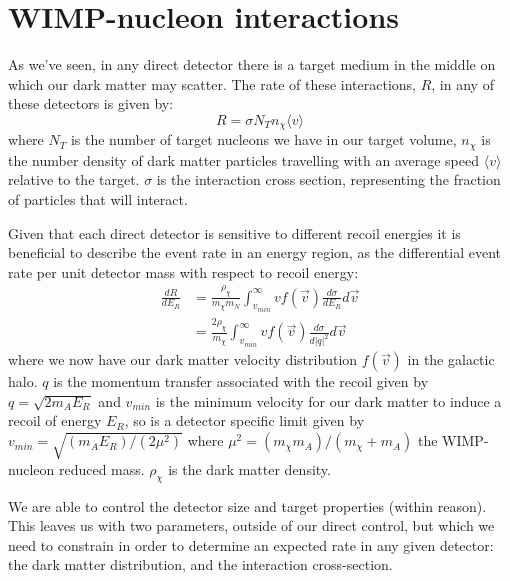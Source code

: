 \section{WIMP-nucleon interactions} \label{sec:wimp_nucleus_interactions}
\par
As we've seen, in any direct detector there is a target medium in the middle on which our dark matter may scatter.
The rate of these interactions, $R$, in any of these detectors is given by:
\begin{equation}
    R = \sigma N_{T} n_{\chi} \langle v \rangle
    \label{eq:wimp_nucleon_rate}
\end{equation}
where $N_T$ is the number of target nucleons we have in our target volume, $n_\chi$ is the number density of dark matter particles travelling with an average speed $\langle v \rangle$ relative to the target.
$\sigma$ is the interaction cross section, representing the fraction of particles that will interact.
\par
Given that each direct detector is sensitive to different recoil energies it is beneficial to describe the event rate in an energy region, as the differential event rate per unit detector mass with respect to recoil energy:
\begin{equation}
\begin{split}
    \frac{dR}{dE_R} &= \frac{\rho_{\chi}}{m_\chi m_N} \int^{\infty}_{v_{min}} v f(\vec{v}) \frac{d\sigma}{dE_R} d\vec{v} \\
                    &= \frac{2\rho_{\chi}}{m_\chi} \int^{\infty}_{v_{min}} v f(\vec{v}) \frac{d\sigma}{d |q|^2} d\vec{v}
\end{split}
\label{eq:wimp_differential_rate}
\end{equation}
where we now have our dark matter velocity distribution $f(\vec{v})$ in the galactic halo.
$q$ is the momentum transfer associated with the recoil given by $q = \sqrt{2m_A E_R}$ and $v_{min}$ is the minimum velocity for our dark matter to induce a recoil of energy $E_R$, so is a detector specific limit given by $v_{min} = \sqrt{(m_A E_R)/(2\mu^2)}$ where $\mu^2 = (m_\chi m_A)/(m_\chi + m_A)$ the WIMP-nucleon reduced mass.
$\rho_{\chi}$ is the dark matter density.

\par
We are able to control the detector size and target properties (within reason).
This leaves us with two parameters, outside of our direct control, but which we need to constrain in order to determine an expected rate in any given detector: the dark matter distribution, and the interaction cross-section.



